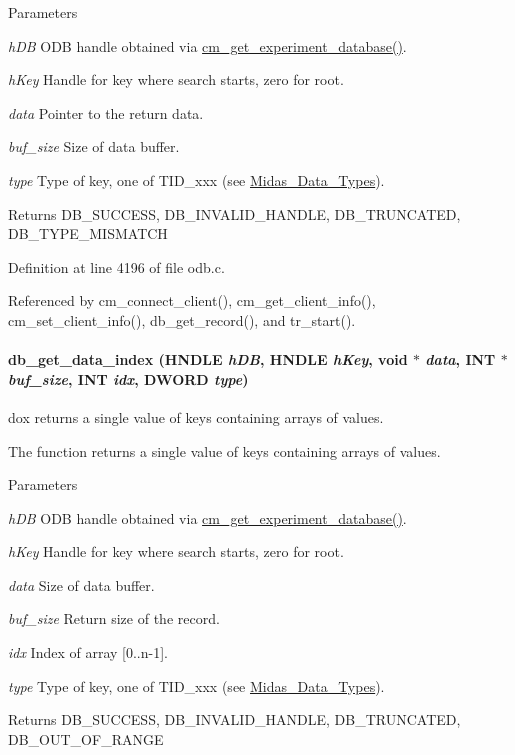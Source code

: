 \begin{DoxyParams}{Parameters}
\item[{\em hDB}]ODB handle obtained via \hyperlink{group__cmfunctionc_ga16b33b70783a3f5ba98b4094149d12b7}{cm\_\-get\_\-experiment\_\-database()}. \item[{\em hKey}]Handle for key where search starts, zero for root. \item[{\em data}]Pointer to the return data. \item[{\em buf\_\-size}]Size of data buffer. \item[{\em type}]Type of key, one of TID\_\-xxx (see \hyperlink{F_Midas_Code_and_Libraries_Midas_Data_Types}{Midas\_\-Data\_\-Types}). \end{DoxyParams}
\begin{DoxyReturn}{Returns}
DB\_\-SUCCESS, DB\_\-INVALID\_\-HANDLE, DB\_\-TRUNCATED, DB\_\-TYPE\_\-MISMATCH 
\end{DoxyReturn}


Definition at line 4196 of file odb.c.

Referenced by cm\_\-connect\_\-client(), cm\_\-get\_\-client\_\-info(), cm\_\-set\_\-client\_\-info(), db\_\-get\_\-record(), and tr\_\-start().
\paragraph[{db\_\-get\_\-data\_\-index}]{ db\_\-get\_\-data\_\-index (HNDLE {\em hDB}, \/  HNDLE {\em hKey}, \/  void $\ast$ {\em data}, \/  {\bf INT} $\ast$ {\em buf\_\-size}, \/  {\bf INT} {\em idx}, \/  {\bf DWORD} {\em type})}\hfill\label{group__odbfunctionc_gab98f9bb7f141c72261bf56407370fab3}
dox returns a single value of keys containing arrays of values.

The function returns a single value of keys containing arrays of values. 
\begin{DoxyParams}{Parameters}
\item[{\em hDB}]ODB handle obtained via \hyperlink{group__cmfunctionc_ga16b33b70783a3f5ba98b4094149d12b7}{cm\_\-get\_\-experiment\_\-database()}. \item[{\em hKey}]Handle for key where search starts, zero for root. \item[{\em data}]Size of data buffer. \item[{\em buf\_\-size}]Return size of the record. \item[{\em idx}]Index of array \mbox{[}0..n-\/1\mbox{]}. \item[{\em type}]Type of key, one of TID\_\-xxx (see \hyperlink{F_Midas_Code_and_Libraries_Midas_Data_Types}{Midas\_\-Data\_\-Types}). \end{DoxyParams}
\begin{DoxyReturn}{Returns}
DB\_\-SUCCESS, DB\_\-INVALID\_\-HANDLE, DB\_\-TRUNCATED, DB\_\-OUT\_\-OF\_\-RANGE 
\end{DoxyReturn}


